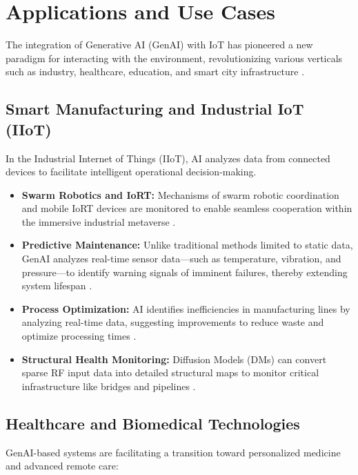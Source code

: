 \documentclass[journal]{IEEEtran}
\begin{document}
\section{Applications and Use Cases}
The integration of Generative AI (GenAI) with IoT has pioneered a new paradigm for interacting with the environment, revolutionizing various verticals such as industry, healthcare, education, and smart city infrastructure \cite{26, 27}.

\subsection{Smart Manufacturing and Industrial IoT (IIoT)}
In the Industrial Internet of Things (IIoT), AI analyzes data from connected devices to facilitate intelligent operational decision-making.

\begin{itemize}
    \item \textbf{Swarm Robotics and IoRT:} Mechanisms of swarm robotic coordination and mobile IoRT devices are monitored to enable seamless cooperation within the immersive industrial metaverse \cite{31}.
    \item \textbf{Predictive Maintenance:} Unlike traditional methods limited to static data, GenAI analyzes real-time sensor data—such as temperature, vibration, and pressure—to identify warning signals of imminent failures, thereby extending system lifespan \cite{11, 23}.
    \item \textbf{Process Optimization:} AI identifies inefficiencies in manufacturing lines by analyzing real-time data, suggesting improvements to reduce waste and optimize processing times \cite{11}.
    \item \textbf{Structural Health Monitoring:} Diffusion Models (DMs) can convert sparse RF input data into detailed structural maps to monitor critical infrastructure like bridges and pipelines \cite{22}.
\end{itemize}

\subsection{Healthcare and Biomedical Technologies}
GenAI-based systems are facilitating a transition toward personalized medicine and advanced remote care:
\end{document}

